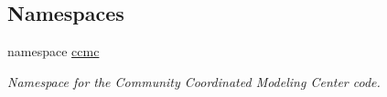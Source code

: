 \subsection*{Namespaces}
\begin{DoxyCompactItemize}
\item 
namespace \hyperlink{namespaceccmc}{ccmc}
\begin{DoxyCompactList}\small\item\em Namespace for the Community Coordinated Modeling Center code. \end{DoxyCompactList}\end{DoxyCompactItemize}
